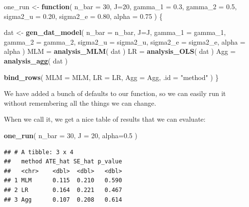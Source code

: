 \documentclass[
]{book}
\newenvironment{Shaded}{\begin{snugshade}}{\end{snugshade}}
\newcommand{\AttributeTok}[1]{\textcolor[rgb]{0.13,0.29,0.53}{#1}}
\newcommand{\ControlFlowTok}[1]{\textcolor[rgb]{0.13,0.29,0.53}{\textbf{#1}}}
\newcommand{\DecValTok}[1]{\textcolor[rgb]{0.00,0.00,0.81}{#1}}
\newcommand{\FloatTok}[1]{\textcolor[rgb]{0.00,0.00,0.81}{#1}}
\newcommand{\FunctionTok}[1]{\textcolor[rgb]{0.13,0.29,0.53}{\textbf{#1}}}
\newcommand{\NormalTok}[1]{#1}
\newcommand{\OtherTok}[1]{\textcolor[rgb]{0.56,0.35,0.01}{#1}}
\newcommand{\StringTok}[1]{\textcolor[rgb]{0.31,0.60,0.02}{#1}}
\begin{document}
\begin{Shaded}
\begin{Highlighting}[]
\NormalTok{one\_run }\OtherTok{\textless{}{-}} \ControlFlowTok{function}\NormalTok{( }\AttributeTok{n\_bar =} \DecValTok{30}\NormalTok{, }\AttributeTok{J=}\DecValTok{20}\NormalTok{, }
                     \AttributeTok{gamma\_1 =} \FloatTok{0.3}\NormalTok{, }\AttributeTok{gamma\_2 =} \FloatTok{0.5}\NormalTok{,}
                     \AttributeTok{sigma2\_u =} \FloatTok{0.20}\NormalTok{, }\AttributeTok{sigma2\_e =} \FloatTok{0.80}\NormalTok{,}
                     \AttributeTok{alpha =} \FloatTok{0.75}\NormalTok{ ) \{}
  
\NormalTok{  dat }\OtherTok{\textless{}{-}} \FunctionTok{gen\_dat\_model}\NormalTok{( }\AttributeTok{n\_bar =}\NormalTok{ n\_bar, }\AttributeTok{J=}\NormalTok{J, }
                        \AttributeTok{gamma\_1 =}\NormalTok{ gamma\_1, }\AttributeTok{gamma\_2 =}\NormalTok{ gamma\_2,}
                        \AttributeTok{sigma2\_u =}\NormalTok{ sigma2\_u, }\AttributeTok{sigma2\_e =}\NormalTok{ sigma2\_e,}
                        \AttributeTok{alpha =}\NormalTok{ alpha )}
\NormalTok{  MLM }\OtherTok{=} \FunctionTok{analysis\_MLM}\NormalTok{( dat )}
\NormalTok{  LR }\OtherTok{=} \FunctionTok{analysis\_OLS}\NormalTok{( dat )}
\NormalTok{  Agg }\OtherTok{=} \FunctionTok{analysis\_agg}\NormalTok{( dat )}
  
  \FunctionTok{bind\_rows}\NormalTok{( }\AttributeTok{MLM =}\NormalTok{ MLM, }\AttributeTok{LR =}\NormalTok{ LR, }\AttributeTok{Agg =}\NormalTok{ Agg,}
             \AttributeTok{.id =} \StringTok{"method"}\NormalTok{ )}
\NormalTok{\}}
\end{Highlighting}
\end{Shaded}

We have added a bunch of defaults to our function, so we can easily run it without remembering all the things we can change.

When we call it, we get a nice table of results that we can evaluate:

\begin{Shaded}
\begin{Highlighting}[]
\FunctionTok{one\_run}\NormalTok{( }\AttributeTok{n\_bar =} \DecValTok{30}\NormalTok{, }\AttributeTok{J =} \DecValTok{20}\NormalTok{, }\AttributeTok{alpha=}\FloatTok{0.5}\NormalTok{ )}
\end{Highlighting}
\end{Shaded}

\begin{verbatim}
## # A tibble: 3 x 4
##   method ATE_hat SE_hat p_value
##   <chr>    <dbl>  <dbl>   <dbl>
## 1 MLM      0.115  0.210   0.590
## 2 LR       0.164  0.221   0.467
## 3 Agg      0.107  0.208   0.614
\end{verbatim}
\end{document}
